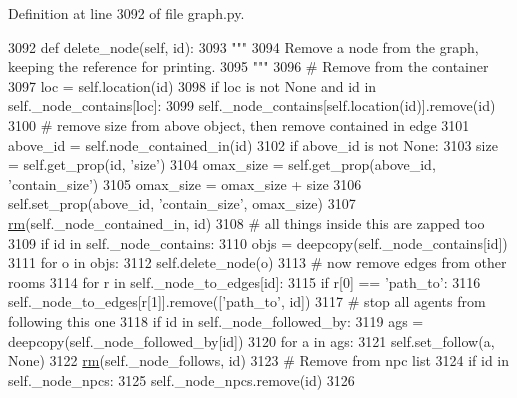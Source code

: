 Definition at line 3092 of file graph.\+py.


\begin{DoxyCode}
3092     \textcolor{keyword}{def }delete\_node(self, id):
3093         \textcolor{stringliteral}{"""}
3094 \textcolor{stringliteral}{        Remove a node from the graph, keeping the reference for printing.}
3095 \textcolor{stringliteral}{        """}
3096         \textcolor{comment}{# Remove from the container}
3097         loc = self.location(id)
3098         \textcolor{keywordflow}{if} loc \textcolor{keywordflow}{is} \textcolor{keywordflow}{not} \textcolor{keywordtype}{None} \textcolor{keywordflow}{and} id \textcolor{keywordflow}{in} self.\_node\_contains[loc]:
3099             self.\_node\_contains[self.location(id)].remove(id)
3100         \textcolor{comment}{# remove size from above object, then remove contained in edge}
3101         above\_id = self.node\_contained\_in(id)
3102         \textcolor{keywordflow}{if} above\_id \textcolor{keywordflow}{is} \textcolor{keywordflow}{not} \textcolor{keywordtype}{None}:
3103             size = self.get\_prop(id, \textcolor{stringliteral}{'size'})
3104             omax\_size = self.get\_prop(above\_id, \textcolor{stringliteral}{'contain\_size'})
3105             omax\_size = omax\_size + size
3106             self.set\_prop(above\_id, \textcolor{stringliteral}{'contain\_size'}, omax\_size)
3107             \hyperlink{namespaceprojects_1_1mastering__the__dungeon_1_1tasks_1_1graph__world2_1_1graph_a0da062d03bdfbab1c65ea71371c0c469}{rm}(self.\_node\_contained\_in, id)
3108         \textcolor{comment}{# all things inside this are zapped too}
3109         \textcolor{keywordflow}{if} id \textcolor{keywordflow}{in} self.\_node\_contains:
3110             objs = deepcopy(self.\_node\_contains[id])
3111             \textcolor{keywordflow}{for} o \textcolor{keywordflow}{in} objs:
3112                 self.delete\_node(o)
3113         \textcolor{comment}{# now remove edges from other rooms}
3114         \textcolor{keywordflow}{for} r \textcolor{keywordflow}{in} self.\_node\_to\_edges[id]:
3115             \textcolor{keywordflow}{if} r[0] == \textcolor{stringliteral}{'path\_to'}:
3116                 self.\_node\_to\_edges[r[1]].remove([\textcolor{stringliteral}{'path\_to'}, id])
3117         \textcolor{comment}{# stop all agents from following this one}
3118         \textcolor{keywordflow}{if} id \textcolor{keywordflow}{in} self.\_node\_followed\_by:
3119             ags = deepcopy(self.\_node\_followed\_by[id])
3120             \textcolor{keywordflow}{for} a \textcolor{keywordflow}{in} ags:
3121                 self.set\_follow(a, \textcolor{keywordtype}{None})
3122         \hyperlink{namespaceprojects_1_1mastering__the__dungeon_1_1tasks_1_1graph__world2_1_1graph_a0da062d03bdfbab1c65ea71371c0c469}{rm}(self.\_node\_follows, id)
3123         \textcolor{comment}{# Remove from npc list}
3124         \textcolor{keywordflow}{if} id \textcolor{keywordflow}{in} self.\_node\_npcs:
3125             self.\_node\_npcs.remove(id)
3126 
\end{DoxyCode}
